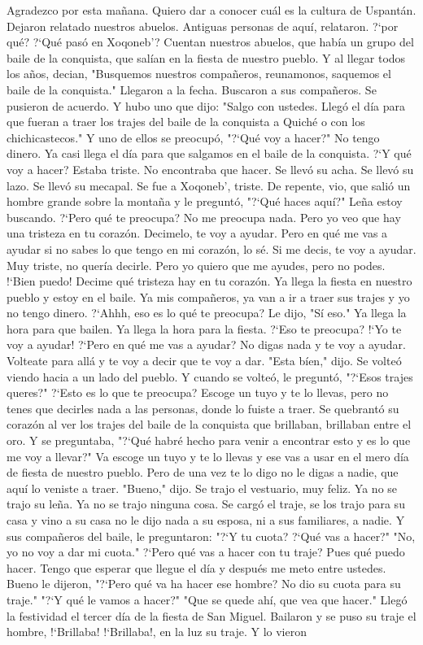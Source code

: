 \documentclass[12pt]{article}
\begin{document}
 Agradezco por esta ma\~nana. Quiero dar a conocer cu\'al es la cultura de Uspant\'an. Dejaron relatado nuestros abuelos. Antiguas personas de aqu\'i, relataron. ?`por qu\'e? ?`Qu\'e pas\'o en Xoqoneb'? Cuentan nuestros abuelos, que hab\'ia un grupo del baile de la conquista, que sal\'ian en la fiesta de nuestro pueblo. Y al llegar todos los a\~nos, decian, "Busquemos nuestros compa\~neros, reunamonos, saquemos el baile de la conquista." Llegaron a la fecha. Buscaron a sus compa\~neros. Se pusieron de acuerdo. Y hubo uno que dijo: "Salgo con ustedes. Lleg\'o el d\'ia para que fueran a traer los trajes del baile de la conquista a Quich\'e o con los chichicastecos." Y uno de ellos se preocup\'o, "?`Qu\'e voy a hacer?" No tengo dinero. Ya casi llega el d\'ia para que salgamos en el baile de la conquista. ?`Y qu\'e voy a hacer? Estaba triste. No encontraba que hacer. Se llev\'o su acha. Se llev\'o su lazo. Se llev\'o su mecapal. Se fue a Xoqoneb', triste. De repente, vio, que sali\'o un hombre grande sobre la monta\~na y le pregunt\'o, "?`Qu\'e haces aqu\'i?" Le\~na estoy buscando. ?`Pero qu\'e te preocupa? No me preocupa nada. Pero yo veo que hay una tristeza en tu coraz\'on. Decimelo, te voy a ayudar. Pero en qu\'e me vas a ayudar si no sabes lo que tengo en mi coraz\'on, lo s\'e. Si me decis, te voy a ayudar. Muy triste, no quer\'ia decirle. Pero yo quiero que me ayudes, pero no podes. !`Bien puedo! Decime qu\'e tristeza hay en tu coraz\'on. Ya llega la fiesta en nuestro pueblo y estoy en el baile. Ya mis compa\~neros, ya van a ir a traer sus trajes y yo no tengo dinero. ?`Ahhh, eso es lo qu\'e te preocupa? Le dijo, "S\'i eso." Ya llega la hora para que bailen. Ya llega la hora para la fiesta. ?`Eso te preocupa? !`Yo te voy a ayudar! ?`Pero en qu\'e me vas a ayudar? No digas nada y te voy a ayudar. Volteate para all\'a y te voy a decir que te voy a dar. "Esta b\'ien," dijo. Se volte\'o viendo hacia a un lado del pueblo. Y cuando se volte\'o, le pregunt\'o, "?`Esos trajes queres?" ?`Esto es lo que te preocupa? Escoge un tuyo y te lo llevas, pero no tenes que decirles nada a las personas, donde lo fuiste a traer. Se quebrant\'o su coraz\'on al ver los trajes del baile de la conquista que brillaban, brillaban entre el oro. Y se preguntaba, "?`Qu\'e habr\'e hecho para venir a encontrar esto y es lo que me voy a llevar?" Va escoge un tuyo y te lo llevas y ese vas a usar en el mero d\'ia de fiesta de nuestro pueblo. Pero de una vez te lo digo no le digas a nadie, que aqu\'i lo veniste a traer. "Bueno," dijo. Se trajo el vestuario, muy feliz. Ya no se trajo su le\~na. Ya no se trajo ninguna cosa. Se carg\'o el traje, se los trajo para su casa y vino a su casa no le dijo nada a su esposa, ni a sus familiares, a nadie. Y sus compa\~neros del baile, le preguntaron: "?`Y tu cuota? ?`Qu\'e vas a hacer?" "No, yo no voy a dar mi cuota." ?`Pero qu\'e vas a hacer con tu traje? Pues qu\'e puedo hacer. Tengo que esperar que llegue el d\'ia y despu\'es me meto entre ustedes. Bueno le dijeron, "?`Pero qu\'e va ha hacer ese hombre? No dio su cuota para su traje." "?`Y qu\'e le vamos a hacer?" "Que se quede ah\'i, que vea que hacer." Lleg\'o la festividad el tercer d\'ia de la fiesta de San Miguel. Bailaron y se puso su traje el hombre, !`Brillaba! !`Brillaba!, en la luz su traje. Y lo vieron 
\end{document}
